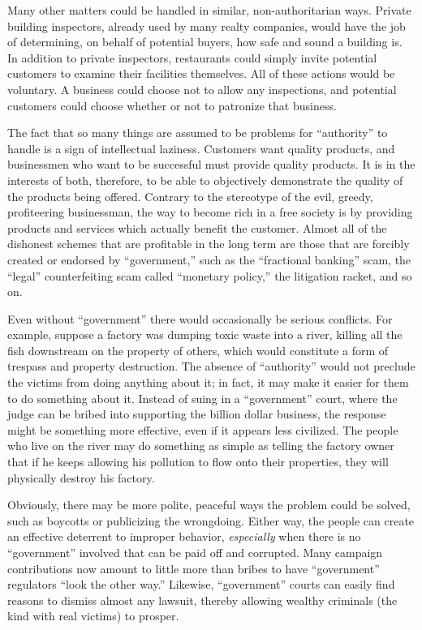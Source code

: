 \documentclass{book}
\begin{document}
Many other matters could be handled in similar, non-authoritarian ways. Private building inspectors, already used by many realty companies, would have the job of determining, on behalf of potential buyers, how safe and sound a building is. In addition to private inspectors, restaurants could simply invite potential customers to examine their facilities themselves. All of these actions would be voluntary. A business could choose not to allow any inspections, and potential customers could choose whether or not to patronize that business.

The fact that so many things are assumed to be problems for \enquote{authority} to handle is a sign of intellectual laziness. Customers want quality products, and businessmen who want to be successful must provide quality products. It is in the interests of both, therefore, to be able to objectively demonstrate the quality of the products being offered. Contrary to the stereotype of the evil, greedy, profiteering businessman, the way to become rich in a free society is by providing products and services which actually benefit the customer. Almost all of the dishonest schemes that are profitable in the long term are those that are forcibly created or endorsed by \enquote{government,} such as the \enquote{fractional banking} scam, the \enquote{legal} counterfeiting scam called \enquote{monetary policy,} the litigation racket, and so on.

Even without \enquote{government} there would occasionally be serious conflicts. For example, suppose a factory was dumping toxic waste into a river, killing all the fish downstream on the property of others, which would constitute a form of trespass and property destruction. The absence of \enquote{authority} would not preclude the victims from doing anything about it; in fact, it may make it easier for them to do something about it. Instead of suing in a \enquote{government} court, where the judge can be bribed into supporting the billion dollar business, the response might be something more effective, even if it appears less civilized. The people who live on the river may do something as simple as telling the factory owner that if he keeps allowing his pollution to flow onto their properties, they will physically destroy his factory.

Obviously, there may be more polite, peaceful ways the problem could be solved, such as boycotts or publicizing the wrongdoing. Either way, the people can create an effective deterrent to improper behavior, \emph{especially} when there is no \enquote{government} involved that can be paid off and corrupted. Many campaign contributions now amount to little more than bribes to have \enquote{government} regulators \enquote{look the other way.} Likewise, \enquote{government} courts can easily find reasons to dismiss almost any lawsuit, thereby allowing wealthy criminals (the kind with real victims) to prosper.
\end{document}
